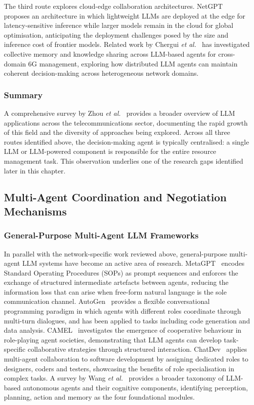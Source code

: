 The third route explores cloud-edge collaboration architectures. NetGPT~\cite{chen2024netgpt} proposes an architecture in which lightweight LLMs are deployed at the edge for latency-sensitive inference while larger models remain in the cloud for global optimisation, anticipating the deployment challenges posed by the size and inference cost of frontier models. Related work by Chergui \emph{et al.}~\cite{chergui2025collective} has investigated collective memory and knowledge sharing across LLM-based agents for cross-domain 6G management, exploring how distributed LLM agents can maintain coherent decision-making across heterogeneous network domains.

\subsubsection{Summary}

A comprehensive survey by Zhou \emph{et al.}~\cite{zhou2024llmtelecom} provides a broader overview of LLM applications across the telecommunications sector, documenting the rapid growth of this field and the diversity of approaches being explored. Across all three routes identified above, the decision-making agent is typically centralised: a single LLM or LLM-powered component is responsible for the entire resource management task. This observation underlies one of the research gaps identified later in this chapter.

\subsection{Multi-Agent Coordination and Negotiation Mechanisms}

\subsubsection{General-Purpose Multi-Agent LLM Frameworks}

In parallel with the network-specific work reviewed above, general-purpose multi-agent LLM systems have become an active area of research. MetaGPT~\cite{hong2023metagpt} encodes Standard Operating Procedures (SOPs) as prompt sequences and enforces the exchange of structured intermediate artefacts between agents, reducing the information loss that can arise when free-form natural language is the sole communication channel. AutoGen~\cite{wu2023autogen} provides a flexible conversational programming paradigm in which agents with different roles coordinate through multi-turn dialogues, and has been applied to tasks including code generation and data analysis. CAMEL~\cite{li2023camel} investigates the emergence of cooperative behaviour in role-playing agent societies, demonstrating that LLM agents can develop task-specific collaborative strategies through structured interaction. ChatDev~\cite{qian2023chatdev} applies multi-agent collaboration to software development by assigning dedicated roles to designers, coders and testers, showcasing the benefits of role specialisation in complex tasks. A survey by Wang \emph{et al.}~\cite{wang2023agentsurvey} provides a broader taxonomy of LLM-based autonomous agents and their cognitive components, identifying perception, planning, action and memory as the four foundational modules.

